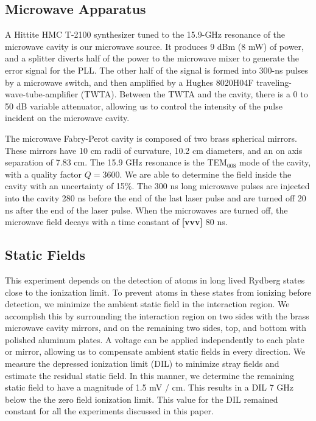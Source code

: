 \documentclass[aps,pra,preprint,groupedaddress]{revtex4-1}
\begin{document}
\subsection{\label{cavity} Microwave Apparatus}


A Hittite HMC T-2100 synthesizer tuned to the 15.9-GHz resonance of the microwave cavity is our microwave source. It produces 9 dBm (8 mW) of power, and a splitter diverts half of the power to the microwave mixer to generate the error signal for the PLL. The other half of the signal is formed into 300-ns pulses by a microwave switch, and then amplified by a Hughes 8020H04F traveling-wave-tube-amplifier (TWTA). Between the TWTA and the cavity, there is a 0 to 50 dB variable attenuator, allowing us to control the intensity of the pulse incident on the microwave cavity.


The microwave Fabry-Perot cavity is composed of two brass spherical mirrors. These mirrors have 10 cm radii of curvature, 10.2 cm diameters, and an on axis separation of 7.83 cm. The 15.9 GHz resonance is the TEM$_{008}$ mode of the cavity, with a quality factor $Q=3600$. We are able to determine the field inside the cavity with an uncertainty of 15\%. The 300 ns long microwave pulses are injected into the cavity 280 ns before the end of the last laser pulse and are turned off 20 ns after the end of the laser pulse. When the microwaves are turned off, the microwave field decays with a time constant of \textbf{[vvv]} 80 ns.


\subsection{\label{fields} Static Fields}


This experiment depends on the detection of atoms in long lived Rydberg states close to the ionization limit. To prevent atoms in these states from ionizing before detection, we minimize the ambient static field in the interaction region. We accomplish this by surrounding the interaction region on two sides with the brass microwave cavity mirrors, and on the remaining two sides, top, and bottom with polished aluminum plates. A voltage can be applied independently to each plate or mirror, allowing us to compensate ambient static fields in every direction. We measure the depressed ionization limit (DIL) to minimize stray fields and estimate the residual static field. In this manner, we determine the remaining static field to have a magnitude of 1.5 mV / cm. This results in a DIL 7 GHz below the the zero field ionization limit. This value for the DIL remained constant for all the experiments discussed in this paper.
\end{document}
